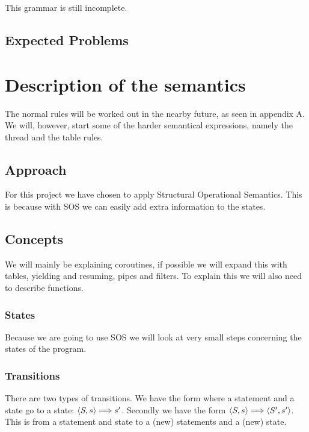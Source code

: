 \documentclass{article}
\begin{document}
This grammar is still incomplete.


\subsection{Expected Problems}

\section{Description of the semantics}
The normal rules will be worked out in the nearby future, as seen in appendix A. We will, however, start some of the harder semantical expressions, namely the thread and the table rules.\\

\subsection{Approach}
For this project we have chosen to apply Structural Operational Semantics. This is because with SOS we can easily add extra information to the states. %
\subsection{Concepts}
We will mainly be explaining coroutines, if possible we will expand this with tables, yielding and resuming, pipes and filters. To explain this we will also need to describe functions.
\subsubsection{States}
Because we are going to use SOS we will look at very small steps concerning the states of the program. %
\subsubsection{Transitions}
There are two types of transitions. We have the form where a statement and a state go to a state: $\langle S,s\rangle \Longrightarrow s'$. Secondly we have the form $\langle S,s\rangle \Longrightarrow \langle S',s'\rangle$. This is from a statement and state to a (new) statements and a (new) state. 
\end{document}

